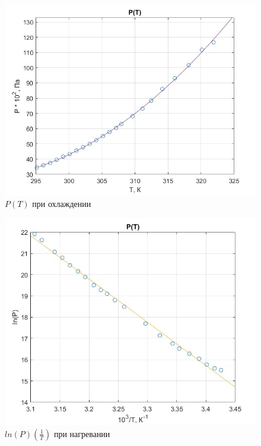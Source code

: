 \documentclass[a4paper, 12pt]{article} %
\begin{document}
\begin{figure}
    \begin{center}
        \includegraphics[scale = 0.74]{xgraph1}
        \caption{$P(T)$ при охлаждении}
    \end{center}
\end{figure}

\begin{figure}
    \begin{center}
        \includegraphics[scale = 0.74]{graph2}
        \caption{$ln(P)(\frac{1}{T})$ при нагревании}
    \end{center}
\end{figure}
\end{document}
